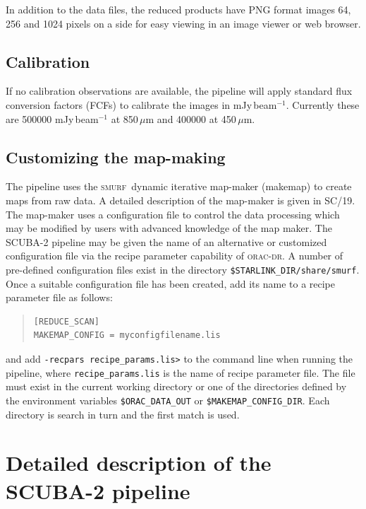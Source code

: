 \documentclass[twoside,11pt]{article}
\newcommand{\xref}[3]{#1}
\newcommand{\xlabel}[1]{}
\renewcommand{\_}{\texttt{\symbol{95}}}
\newenvironment{myquote}{\begin{quote}\begin{small}}{\end{small}\end{quote}}
\newcommand{\SMURF}{\textsc{smurf}}
\newcommand{\SMURFcook}{\xref{SC/19}{sc19}{}}
\newcommand{\oracdr}{\textsc{orac-dr}}
\newcommand{\task}[1]{\textsf{#1}}
\newcommand{\makemap}{\xref{\task{makemap}}{sun258}{MAKEMAP}}
\begin{document}
In addition to the data files, the reduced products have PNG format
images 64, 256 and 1024 pixels on a side for easy viewing in an image
viewer or web browser.

\subsection{Calibration}

If no calibration observations are available, the pipeline will apply
standard flux conversion factors (FCFs) to calibrate the images in
mJy\,beam$^{-1}$. Currently these are 500000 mJy\,beam$^{-1}$ at
850\,$\mu$m and 400000 at 450\,$\mu$m.

\subsection{Customizing the map-making}

The pipeline uses the \SMURF\ dynamic iterative map-maker (\makemap)
to create maps from raw data. A detailed description of the map-maker
is given in \SMURFcook. The map-maker uses a configuration file to
control the data processing which may be modified by users with
advanced knowledge of the map maker. The SCUBA-2 pipeline may be given
the name of an alternative or customized configuration file via the
recipe parameter capability of \oracdr. A number of pre-defined
configuration files exist in the directory
\verb+$STARLINK_DIR/share/smurf+. Once a suitable configuration file
has been created, add its name to a recipe parameter file as follows:
\begin{myquote}
\begin{verbatim}
[REDUCE_SCAN]
MAKEMAP_CONFIG = myconfigfilename.lis
\end{verbatim}
\end{myquote}
and add \verb+-recpars recipe_params.lis>+ to the command line when
running the pipeline, where \verb+recipe_params.lis+ is the name of
recipe parameter file. The file must exist in the current working
directory or one of the directories defined by the environment
variables \verb+$ORAC_DATA_OUT+ or \verb+$MAKEMAP_CONFIG_DIR+. Each
directory is search in turn and the first match is used.

\section{\xlabel{details}Detailed description of the SCUBA-2 pipeline\label{se:details}}
\end{document}
